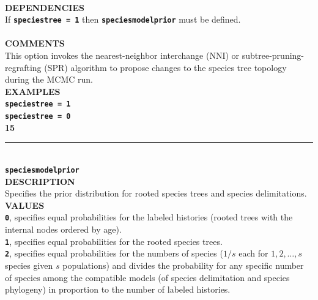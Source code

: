 \documentclass{book}
\numberwithin{equation}{section} \renewcommand{\baselinestretch}{0.55}
\begin{document}
\textbf{\texttt{}} \vspace{5pt}\\
\textbf{DEPENDENCIES} \vspace{5pt}\\
If \textbf{\texttt{speciestree = 1}} then \textbf{\texttt{speciesmodelprior}} must be defined. \vspace{5pt}\\
\vspace{5pt}\\
\textbf{COMMENTS} \vspace{5pt}\\
This option invokes the nearest-neighbor interchange (NNI) or
subtree-pruning-regrafting (SPR) algorithm to propose changes to the
species tree topology during the MCMC run.
\vspace{5pt}\\
\textbf{EXAMPLES} \vspace{5pt}\\
\textbf{\texttt{speciestree = 1}} \vspace{5pt}\\
\textbf{\texttt{speciestree = 0}}\vspace{10pt}\\
\textbf{{\large 15}} \\
\noindent\rule{\textwidth}{0.8pt} \\
\textbf{{\Large \texttt{speciesmodelprior}}} \vspace{5pt}\\
\textbf{DESCRIPTION} \vspace{5pt}\\
Specifies the prior distribution for rooted species trees and species delimitations. \vspace{5pt}\\
\textbf{VALUES} \vspace{5pt}\\
\textbf{\texttt{0}}, specifies equal probabilities for the labeled histories (rooted trees with the internal nodes ordered by age). \vspace{5pt}\\
\textbf{\texttt{1}}, specifies equal probabilities for the rooted species trees. \vspace{5pt}\\
\textbf{\texttt{2}}, specifies equal probabilities for the numbers of species ($1/s$ each for $1,2,\ldots,s$ species given $s$ populations) and divides the probability for any specific number of species among the compatible models (of species delimitation and species phylogeny) in proportion to the number of labeled histories. \vspace{5pt}\\
\end{document}
